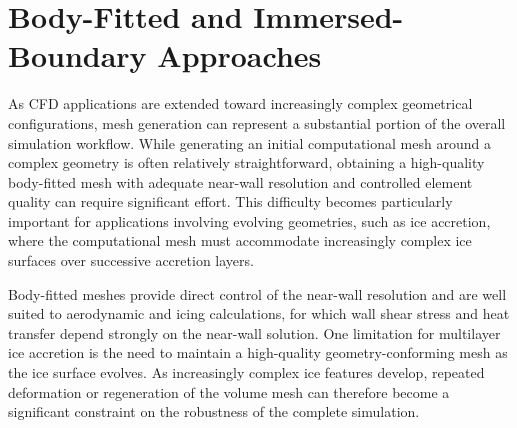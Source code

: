 
\section{Body-Fitted and Immersed-Boundary Approaches}

As CFD applications are extended toward increasingly complex geometrical configurations, mesh generation can represent a substantial portion of the overall simulation workflow. While generating an initial computational mesh around a complex geometry is often relatively straightforward, obtaining a high-quality body-fitted mesh with adequate near-wall resolution and controlled element quality can require significant effort. This difficulty becomes particularly important for applications involving evolving geometries, such as ice accretion, where the computational mesh must accommodate increasingly complex ice surfaces over successive accretion layers.

Body-fitted meshes provide direct control of the near-wall resolution and are well suited to aerodynamic and icing calculations, for which wall shear stress and heat transfer depend strongly on the near-wall solution. One limitation for multilayer ice accretion is the need to maintain a high-quality geometry-conforming mesh as the ice surface evolves. As increasingly complex ice features develop, repeated deformation or regeneration of the volume mesh can therefore become a significant constraint on the robustness of the complete simulation.

